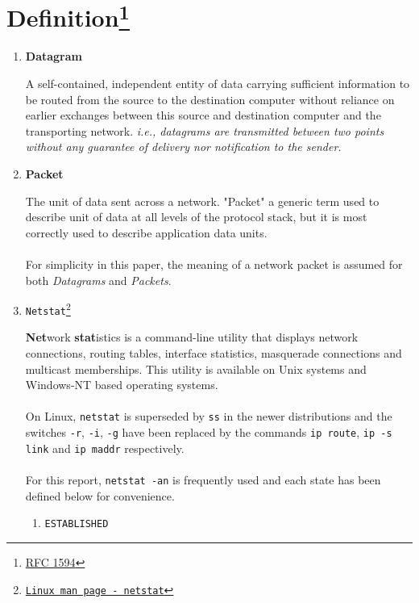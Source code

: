 \documentclass[a4paper,12pt]{article}
\begin{document}
	\section{Definition\protect\footnote{\href{https://tools.ietf.org/html/rfc1594}{RFC 1594}}}
	\begin{enumerate}
		\item \textbf{Datagram}
		\begin{par}A self-contained, independent entity of data carrying sufficient information to be routed from the source to the destination computer without reliance on earlier exchanges between this source and destination computer and the transporting network. \textit{i.e., datagrams are transmitted between two points without any guarantee of delivery nor notification to the sender.}
		\end{par}
	\item \textbf{Packet}
	\begin{par}The unit of data sent across a network. "Packet" a generic term used to describe unit of data at all levels of the protocol stack, but it is most correctly used to describe application data units.\\\\For simplicity in this paper, the meaning of a network packet is assumed for both \textit{Datagrams} and \textit{Packets}.\end{par}
\item \texttt{Netstat\protect\footnote{\href{https://linux.die.net/man/8/netstat}{Linux man page - netstat}}}
\begin{par}
	\textbf{Net}work \textbf{stat}istics is a command-line utility that displays network connections, routing tables, interface statistics, masquerade connections and multicast memberships. This utility is available on Unix systems and Windows-NT based operating systems.\\\\On Linux, \texttt{netstat} is superseded by \texttt{ss} in the newer distributions and the switches \texttt{-r}, \texttt{-i}, \texttt{-g} have been replaced by the commands \texttt{ip route}, \texttt{ip -s link} and \texttt{ip maddr} respectively.\\\\For this report, \texttt{netstat -an} is frequently used and each state has been defined below for convenience.
	\end{par}
\begin{enumerate}
	\item \texttt{ESTABLISHED}
	\begin{par}

\end{par}
\end{enumerate}
\end{enumerate}
\end{document}
